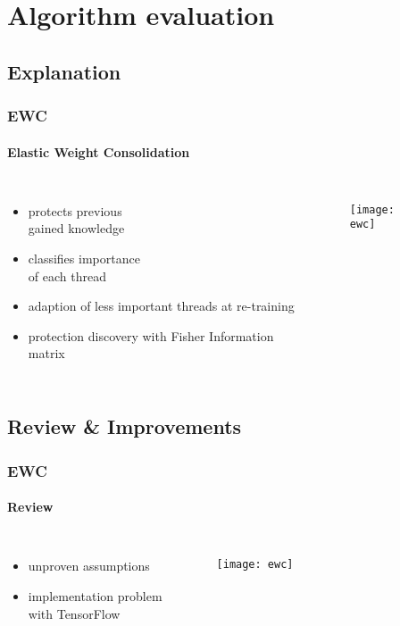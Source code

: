 \section{Algorithm evaluation}

    \subsection{Explanation}

        \begin{frame}
            \frametitle{EWC}
            \framesubtitle{Elastic Weight Consolidation}

            \begin{columns}[onlytextwidth]
                    \begin{itemize}
                        \item protects previous \\gained knowledge
                        \item classifies importance \\of each thread
                        \item adaption of less important threads at re-training
                        \item protection discovery with Fisher Information matrix
                    \end{itemize}
                \begin{figure}[H]
                    \centering
                    \texttt{[image: ewc]}
                    \label{fig:ewc_expl}
                \end{figure}
            \end{columns}

        \end{frame}

    \subsection{Review \& Improvements}

        \begin{frame}
            \frametitle{EWC}
            \framesubtitle{Review}

            \begin{columns}[onlytextwidth]
                    \begin{itemize}
                        \item unproven assumptions
                        \item implementation problem\\with TensorFlow
                    \end{itemize}
                \begin{figure}[H]
                    \centering
                    \texttt{[image: ewc]}
                \end{figure}
            \end{columns}
        \end{frame}

